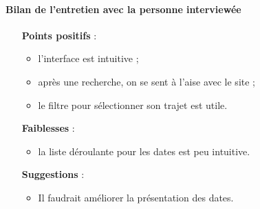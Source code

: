 \paragraph{Bilan de l'entretien avec la personne interview\'{e}e}

\begin{itemize}
  \item [\textbf{Points positifs}] :
      \begin{itemize}
      	\item l'interface est intuitive ;
        \item apr\`{e}s une recherche, on se sent \`{a} l'aise avec le site ;
        \item le filtre pour s\'{e}lectionner son trajet est utile.
      \end{itemize}
      
  \item [\textbf{Faiblesses}] :
      \begin{itemize}
      	\item la liste d\'{e}roulante pour les dates est peu intuitive.
      \end{itemize}
      
  \item [\textbf{Suggestions}] :
      \begin{itemize}
      	\item Il faudrait am\'{e}liorer la pr\'{e}sentation des dates.
      \end{itemize}
\end{itemize}
